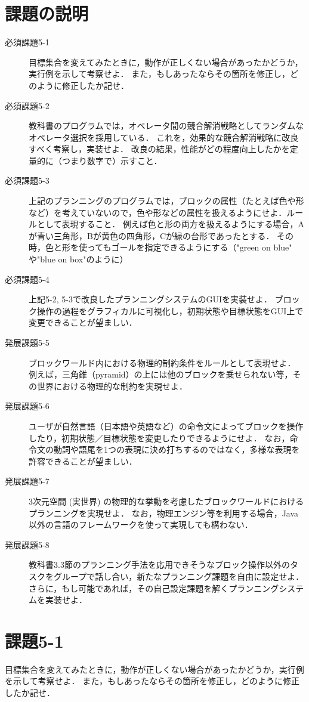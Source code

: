 \documentclass{jarticle}
\begin{document}
\section{課題の説明}
\begin{description}
    \item[必須課題5-1] 目標集合を変えてみたときに，動作が正しくない場合があったかどうか，実行例を示して考察せよ．
    また，もしあったならその箇所を修正し，どのように修正したか記せ．
    \item[必須課題5-2] 教科書のプログラムでは，オペレータ間の競合解消戦略としてランダムなオペレータ選択を採用している．
    これを，効果的な競合解消戦略に改良すべく考察し，実装せよ．
    改良の結果，性能がどの程度向上したかを定量的に（つまり数字で）示すこと．
    \item[必須課題5-3] 上記のプランニングのプログラムでは，ブロックの属性（たとえば色や形など）を考えていないので，色や形などの属性を扱えるようにせよ．ルールとして表現すること．
    例えば色と形の両方を扱えるようにする場合，Aが青い三角形，Bが黄色の四角形，Cが緑の台形であったとする．
    その時，色と形を使ってもゴールを指定できるようにする（"green on blue" や"blue on box"のように）
    \item[必須課題5-4] 上記5-2, 5-3で改良したプランニングシステムのGUIを実装せよ．
    ブロック操作の過程をグラフィカルに可視化し，初期状態や目標状態をGUI上で変更できることが望ましい．
    \item[発展課題5-5] ブロックワールド内における物理的制約条件をルールとして表現せよ．
    例えば，三角錐（pyramid）の上には他のブロックを乗せられない等，その世界における物理的な制約を実現せよ．
    \item[発展課題5-6] ユーザが自然言語（日本語や英語など）の命令文によってブロックを操作したり，初期状態／目標状態を変更したりできるようにせよ．
    なお，命令文の動詞や語尾を1つの表現に決め打ちするのではなく，多様な表現を許容できることが望ましい．
    \item[発展課題5-7] 3次元空間 (実世界) の物理的な挙動を考慮したブロックワールドにおけるプランニングを実現せよ．
    なお，物理エンジン等を利用する場合，Java以外の言語のフレームワークを使って実現しても構わない．
    \item[発展課題5-8] 教科書3.3節のプランニング手法を応用できそうなブロック操作以外のタスクをグループで話し合い，新たなプランニング課題を自由に設定せよ．
    さらに，もし可能であれば，その自己設定課題を解くプランニングシステムを実装せよ．    
\end{description}

\section{課題5-1}
\begin{screen}
    目標集合を変えてみたときに，動作が正しくない場合があったかどうか，実行例を示して考察せよ．
    また，もしあったならその箇所を修正し，どのように修正したか記せ．
\end{screen}
\end{document}
